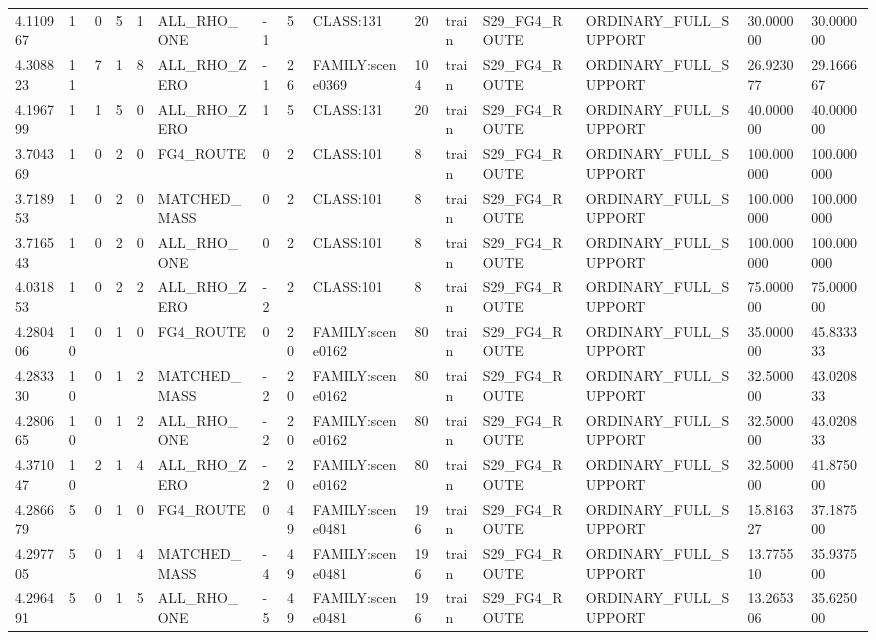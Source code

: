 \begin{tabular}{lllllllllllllll}
4.110967 & 1 & 0 & 5 & 1 & ALL\_RHO\_ONE & -1 & 5 & CLASS:131 & 20 & train & S29\_FG4\_ROUTE & ORDINARY\_FULL\_SUPPORT & 30.000000 & 30.000000 \\
4.308823 & 11 & 7 & 1 & 8 & ALL\_RHO\_ZERO & -1 & 26 & FAMILY:scene0369 & 104 & train & S29\_FG4\_ROUTE & ORDINARY\_FULL\_SUPPORT & 26.923077 & 29.166667 \\
4.196799 & 1 & 1 & 5 & 0 & ALL\_RHO\_ZERO & 1 & 5 & CLASS:131 & 20 & train & S29\_FG4\_ROUTE & ORDINARY\_FULL\_SUPPORT & 40.000000 & 40.000000 \\
3.704369 & 1 & 0 & 2 & 0 & FG4\_ROUTE & 0 & 2 & CLASS:101 & 8 & train & S29\_FG4\_ROUTE & ORDINARY\_FULL\_SUPPORT & 100.000000 & 100.000000 \\
3.718953 & 1 & 0 & 2 & 0 & MATCHED\_MASS & 0 & 2 & CLASS:101 & 8 & train & S29\_FG4\_ROUTE & ORDINARY\_FULL\_SUPPORT & 100.000000 & 100.000000 \\
3.716543 & 1 & 0 & 2 & 0 & ALL\_RHO\_ONE & 0 & 2 & CLASS:101 & 8 & train & S29\_FG4\_ROUTE & ORDINARY\_FULL\_SUPPORT & 100.000000 & 100.000000 \\
4.031853 & 1 & 0 & 2 & 2 & ALL\_RHO\_ZERO & -2 & 2 & CLASS:101 & 8 & train & S29\_FG4\_ROUTE & ORDINARY\_FULL\_SUPPORT & 75.000000 & 75.000000 \\
4.280406 & 10 & 0 & 1 & 0 & FG4\_ROUTE & 0 & 20 & FAMILY:scene0162 & 80 & train & S29\_FG4\_ROUTE & ORDINARY\_FULL\_SUPPORT & 35.000000 & 45.833333 \\
4.283330 & 10 & 0 & 1 & 2 & MATCHED\_MASS & -2 & 20 & FAMILY:scene0162 & 80 & train & S29\_FG4\_ROUTE & ORDINARY\_FULL\_SUPPORT & 32.500000 & 43.020833 \\
4.280665 & 10 & 0 & 1 & 2 & ALL\_RHO\_ONE & -2 & 20 & FAMILY:scene0162 & 80 & train & S29\_FG4\_ROUTE & ORDINARY\_FULL\_SUPPORT & 32.500000 & 43.020833 \\
4.371047 & 10 & 2 & 1 & 4 & ALL\_RHO\_ZERO & -2 & 20 & FAMILY:scene0162 & 80 & train & S29\_FG4\_ROUTE & ORDINARY\_FULL\_SUPPORT & 32.500000 & 41.875000 \\
4.286679 & 5 & 0 & 1 & 0 & FG4\_ROUTE & 0 & 49 & FAMILY:scene0481 & 196 & train & S29\_FG4\_ROUTE & ORDINARY\_FULL\_SUPPORT & 15.816327 & 37.187500 \\
4.297705 & 5 & 0 & 1 & 4 & MATCHED\_MASS & -4 & 49 & FAMILY:scene0481 & 196 & train & S29\_FG4\_ROUTE & ORDINARY\_FULL\_SUPPORT & 13.775510 & 35.937500 \\
4.296491 & 5 & 0 & 1 & 5 & ALL\_RHO\_ONE & -5 & 49 & FAMILY:scene0481 & 196 & train & S29\_FG4\_ROUTE & ORDINARY\_FULL\_SUPPORT & 13.265306 & 35.625000 \\

\end{tabular}
